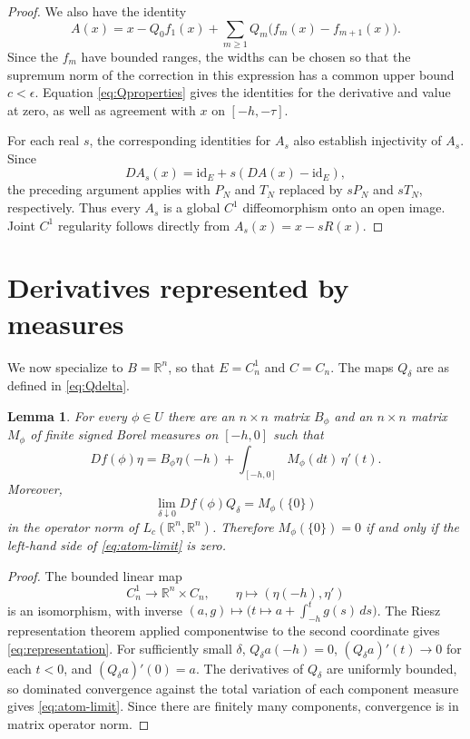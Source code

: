 \documentclass[11pt]{article}
\newtheorem{lemma}[theorem]{Lemma}
\newcommand{\Lc}{L_c}
\newcommand{\id}{\mathrm{id}}
\begin{document}
\begin{proof}
We also have the identity
\begin{equation}\label{eq:telA}
A(x)=x-Q_0f_1(x)
+\sum_{m\ge1}
Q_m\bigl(f_m(x)-f_{m+1}(x)\bigr).
\end{equation}
Since the $f_m$ have bounded ranges,
the widths can be chosen so that the
supremum norm of the correction in this
expression has a common upper bound
$c<\epsilon$. Equation
\eqref{eq:Qproperties} gives the identities
for the derivative and value at zero,
as well as agreement with $x$ on
$[-h,-\tau]$.

For each real $s$, the corresponding identities for $A_s$
also establish injectivity of $A_s$.
Since
\[
DA_s(x)=\id_E+s(DA(x)-\id_E),
\]
the preceding argument applies with
$P_N$ and $T_N$ replaced by $sP_N$
and $sT_N$, respectively. Thus every
$A_s$ is a global $C^1$ diffeomorphism
onto an open image. Joint $C^1$
regularity follows directly from
$A_s(x)=x-sR(x)$.
\end{proof}


\section{Derivatives represented by measures}

We now specialize to $B=\mathbb R^n$, so that
$E=C_n^1$ and $C=C_n$. The maps $Q_\delta$
are as defined in \eqref{eq:Qdelta}.

\begin{lemma}\label{lem:measures}
For every $\phi\in U$ there are an $n\times n$ matrix $B_\phi$ and an $n\times n$ matrix $M_\phi$ of finite signed Borel measures on $[-h,0]$ such that
\begin{equation}\label{eq:representation}
 Df(\phi)\eta=B_\phi\eta(-h)+\int_{[-h,0]}M_\phi(dt)\,\eta'(t).
\end{equation}
Moreover,
\begin{equation}\label{eq:atom-limit}
 \lim_{\delta\downarrow0}Df(\phi)Q_\delta=M_\phi(\{0\})
\end{equation}
in the operator norm of $\Lc(\mathbb R^n,\mathbb R^n)$. Therefore $M_\phi(\{0\})=0$ if and only if the left-hand side of \eqref{eq:atom-limit} is zero.
\end{lemma}
\begin{proof}
The bounded linear map
\[
 C_n^1\longrightarrow\mathbb R^n\times C_n,\qquad
 \eta\longmapsto(\eta(-h),\eta')
\]
is an isomorphism, with inverse $(a,g)\mapsto\bigl(t\mapsto a+\int_{-h}^tg(s)\,ds\bigr)$. The Riesz representation theorem applied componentwise to the second coordinate gives \eqref{eq:representation}. For sufficiently small $\delta$, $Q_\delta a(-h)=0$, $(Q_\delta a)'(t)\to0$ for each $t<0$, and $(Q_\delta a)'(0)=a$. The derivatives of $Q_\delta$ are uniformly bounded, so dominated convergence against the total variation of each component measure gives \eqref{eq:atom-limit}. Since there are finitely many components, convergence is in matrix operator norm.
\end{proof}
\end{document}
